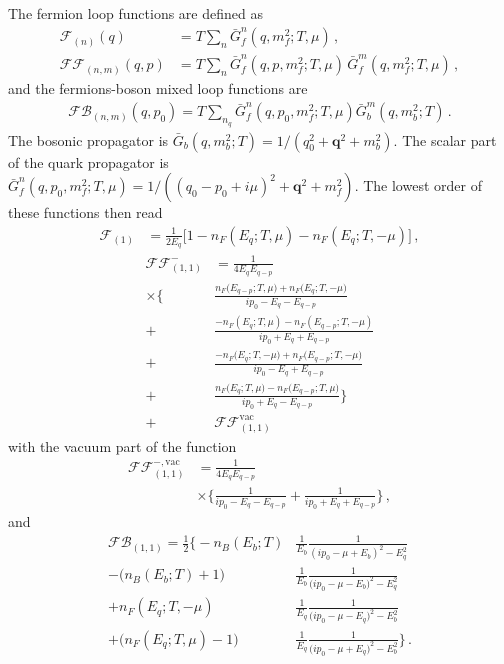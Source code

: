 \documentclass[reprint,english,superscriptaddress,preprintnumbers,amsmath,amssymb,aps,prd]{revtex4-2}
\begin{document}
The fermion loop functions are defined as
%
\begin{align}
\mathcal{F}_{(n)}(q)&=T\sum_n \bar{G}^n_{f}(q,m^2_f;T,\mu)\,,\\[2ex]
\mathcal{FF}_{(n,m)}(q,p)&=T\sum_n \bar{G}^n_{f}(q,p,m^2_f;T,\mu)\,\bar{G}^m_{f}(q,m^2_f;T,\mu)\,,
\end{align}
%
and the fermions-boson mixed loop functions are 
%
\begin{align}
\mathcal{FB}_{(n,m)}(q,p_0)=T\sum_{n_q} \bar{G}^n_{f}(q,p_0,m^2_f;T,\mu)\bar{G}^m_{b}(q,m^2_b;T)\,.
\end{align}
%
The bosonic propagator is $\bar G_b(q,m^2_b;T)=1/(q_0^2+\boldsymbol{q}^2+m_b^2)$. The scalar part of the quark propagator is $\bar{G}^n_{f}(q,p_0,m^2_f;T,\mu)=1/((q_0-p_0+i\mu)^2+\boldsymbol{q}^2+m^2_f)$. The lowest order of these functions then read
%
\begin{align}
    \mathcal{F}_{(1)}&=\frac{1}{2E_q}\bigg[1-n_F(E_q;T,\mu)-n_F(E_q;T,-\mu)\bigg]\,,
\end{align}
%
%
\begin{align}\label{eq:threshold_fun_p}
\mathcal{FF}^-_{(1,1)}&=\frac{1}{4E_qE_{q-p}}\nonumber\\[2ex]
\times\Bigg\{&\frac{n_F\big(E_{q-p};T,\mu\big)+n_F\big(E_q;T,-\mu\big)}{i p_0-E_q-E_{q-p}}\nonumber\\[2ex]
+&\frac{-n_F(E_q;T,\mu)-n_F(E_{q-p};T,-\mu)}{i p_0+E_q+E_{q-p}}\nonumber\\[2ex]
+&\frac{-n_F\big(E_q;T,-\mu \big)+n_F\big(E_{q-p};T,-\mu\big)}{i p_0-E_q+E_{q-p}}\nonumber\\[2ex]
+&\frac{n_F\big(E_q;T,\mu\big)-n_F\big(E_{q-p};T,\mu\big)}{i p_0+E_q-E_{q-p}}\Bigg\}\nonumber\\[2ex]
+&\mathcal{FF}^{\mathrm{vac}}_{(1,1)}
\end{align}
%
with the vacuum part of the function
%
\begin{align}
\mathcal{FF}^{-,\mathrm{vac}}_{(1,1)}&=\frac{1}{4E_qE_{q-p}}\nonumber\\[2ex]
&\times\Bigg\{\frac{1}{ip_0-E_q-E_{q-p}}+\frac{1}{ip_0+E_q+E_{q-p}}\Bigg\}\,,
\end{align}
%
and
%
\begin{align}
\mathcal{FB}_{(1,1)}=\frac{1}{2}\bigg\{-n_B(E_b;T)&\frac{1}{E_b}\frac{1}{(ip_0-\mu+E_b)^2-E_q^2}\nonumber\\[2ex]
-\big(n_B(E_b;T)+1\big)&\frac{1}{E_b}\frac{1}{\big(ip_0-\mu-E_b\big)^2-E_q^2}\nonumber\\[2ex]
+n_F(E_q;T,-\mu)&\frac{1}{E_q}\frac{1}{\big(ip_0-\mu-E_q\big)^2-E_b^2}\nonumber\\[2ex]
+\big(n_F(E_q;T,\mu)-1\big)&\frac{1}{E_q}\frac{1}{\big(ip_0-\mu+E_q\big)^2-E_b^2}\bigg\}\,.
\end{align}
\end{document}
